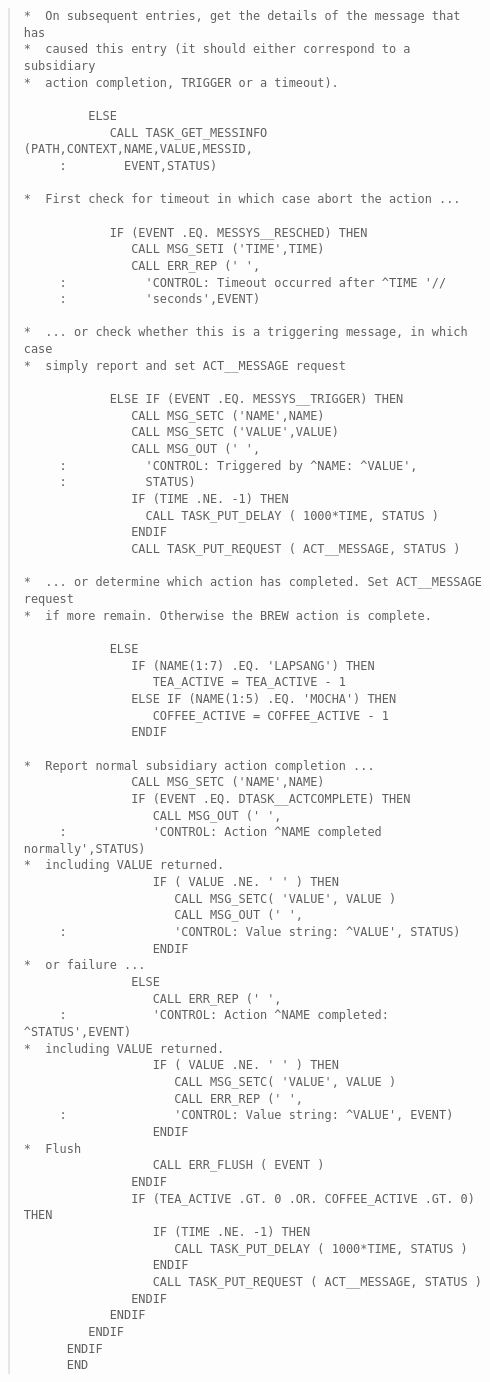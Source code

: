 \documentclass[twoside,11pt]{article}
\renewcommand{\_}{\texttt{\symbol{95}}}
\begin{document}
\begin{quote}
\begin{verbatim}
*  On subsequent entries, get the details of the message that has
*  caused this entry (it should either correspond to a subsidiary
*  action completion, TRIGGER or a timeout).

         ELSE
            CALL TASK_GET_MESSINFO (PATH,CONTEXT,NAME,VALUE,MESSID,
     :        EVENT,STATUS)

*  First check for timeout in which case abort the action ...

            IF (EVENT .EQ. MESSYS__RESCHED) THEN
               CALL MSG_SETI ('TIME',TIME)
               CALL ERR_REP (' ',
     :           'CONTROL: Timeout occurred after ^TIME '//
     :           'seconds',EVENT)

*  ... or check whether this is a triggering message, in which case
*  simply report and set ACT__MESSAGE request

            ELSE IF (EVENT .EQ. MESSYS__TRIGGER) THEN
               CALL MSG_SETC ('NAME',NAME)
               CALL MSG_SETC ('VALUE',VALUE)
               CALL MSG_OUT (' ',
     :           'CONTROL: Triggered by ^NAME: ^VALUE',
     :           STATUS)
               IF (TIME .NE. -1) THEN
                 CALL TASK_PUT_DELAY ( 1000*TIME, STATUS )
               ENDIF
               CALL TASK_PUT_REQUEST ( ACT__MESSAGE, STATUS )

*  ... or determine which action has completed. Set ACT__MESSAGE request
*  if more remain. Otherwise the BREW action is complete.

            ELSE
               IF (NAME(1:7) .EQ. 'LAPSANG') THEN
                  TEA_ACTIVE = TEA_ACTIVE - 1
               ELSE IF (NAME(1:5) .EQ. 'MOCHA') THEN
                  COFFEE_ACTIVE = COFFEE_ACTIVE - 1
               ENDIF

*  Report normal subsidiary action completion ...
               CALL MSG_SETC ('NAME',NAME)
               IF (EVENT .EQ. DTASK__ACTCOMPLETE) THEN
                  CALL MSG_OUT (' ',
     :            'CONTROL: Action ^NAME completed normally',STATUS)
*  including VALUE returned.
                  IF ( VALUE .NE. ' ' ) THEN
                     CALL MSG_SETC( 'VALUE', VALUE )
                     CALL MSG_OUT (' ',
     :               'CONTROL: Value string: ^VALUE', STATUS)
                  ENDIF
*  or failure ...
               ELSE
                  CALL ERR_REP (' ',
     :            'CONTROL: Action ^NAME completed: ^STATUS',EVENT)
*  including VALUE returned.
                  IF ( VALUE .NE. ' ' ) THEN
                     CALL MSG_SETC( 'VALUE', VALUE )
                     CALL ERR_REP (' ',
     :               'CONTROL: Value string: ^VALUE', EVENT)
                  ENDIF
*  Flush
                  CALL ERR_FLUSH ( EVENT )
               ENDIF
               IF (TEA_ACTIVE .GT. 0 .OR. COFFEE_ACTIVE .GT. 0) THEN
                  IF (TIME .NE. -1) THEN
                     CALL TASK_PUT_DELAY ( 1000*TIME, STATUS )
                  ENDIF
                  CALL TASK_PUT_REQUEST ( ACT__MESSAGE, STATUS )
               ENDIF
            ENDIF
         ENDIF
      ENDIF
      END

\end{verbatim} \end{quote} \normalsize
\end{document}
